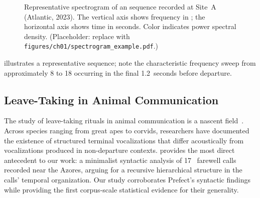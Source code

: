 \begin{figure}[htbp]
	\centering
	\fbox{\rule{0pt}{4cm}\hspace{8cm}}%
	\caption{Representative spectrogram of an 
		sequence recorded at Site~A (Atlantic, 2023). The vertical axis
		shows frequency in \kHz{}; the horizontal axis shows time in
		seconds. Color indicates power spectral density.
		(Placeholder: replace with \texttt{figures/ch01/spectrogram\_example.pdf}.)
	}
	\label{fig:ch01-spectrogram-example}
\end{figure}

 illustrates a representative  sequence;
note the characteristic frequency sweep from approximately 8\kHz{} to 18\kHz{} occurring in the final 1.2~seconds before departure.

\subsection{Leave-Taking in Animal Communication}
\label{subsec:leave-taking}

The study of leave-taking rituals in animal communication is a nascent field~\citep{Marvin2022depression}.
Across species ranging from great apes to corvids, researchers have documented the existence of structured
terminal vocalizations that differ acoustically from vocalizations produced in non-departure contexts.
\citet{Prefect2025syntax} provides the most direct antecedent to our work:
a minimalist syntactic analysis of 17~ farewell calls recorded near the Azores,
arguing for a recursive hierarchical structure in the calls' temporal organization.
Our study corroborates Prefect's syntactic findings while providing the first corpus-scale statistical evidence for their generality.
